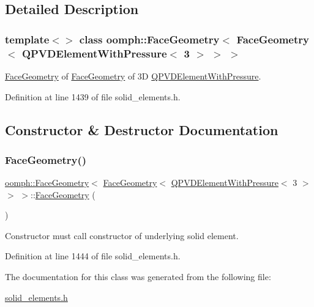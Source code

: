 \subsection{Detailed Description}
\subsubsection*{template$<$$>$\newline
class oomph\+::\+Face\+Geometry$<$ Face\+Geometry$<$ Q\+P\+V\+D\+Element\+With\+Pressure$<$ 3 $>$ $>$ $>$}

\hyperlink{classoomph_1_1FaceGeometry}{Face\+Geometry} of \hyperlink{classoomph_1_1FaceGeometry}{Face\+Geometry} of 3D \hyperlink{classoomph_1_1QPVDElementWithPressure}{Q\+P\+V\+D\+Element\+With\+Pressure}. 

Definition at line 1439 of file solid\+\_\+elements.\+h.



\subsection{Constructor \& Destructor Documentation}
\mbox{\label{classoomph_1_1FaceGeometry_3_01FaceGeometry_3_01QPVDElementWithPressure_3_013_01_4_01_4_01_4_a0e123fcd52796dcbfb88b7ac5e238229}} 
\subsubsection{\texorpdfstring{Face\+Geometry()}{FaceGeometry()}}
{\footnotesize\ttfamily \hyperlink{classoomph_1_1FaceGeometry}{oomph\+::\+Face\+Geometry}$<$ \hyperlink{classoomph_1_1FaceGeometry}{Face\+Geometry}$<$ \hyperlink{classoomph_1_1QPVDElementWithPressure}{Q\+P\+V\+D\+Element\+With\+Pressure}$<$ 3 $>$ $>$ $>$\+::\hyperlink{classoomph_1_1FaceGeometry}{Face\+Geometry} (\begin{DoxyParamCaption}{ }\end{DoxyParamCaption})\hspace{0.3cm}{\ttfamily [inline]}}



Constructor must call constructor of underlying solid element. 



Definition at line 1444 of file solid\+\_\+elements.\+h.



The documentation for this class was generated from the following file\+:\begin{DoxyCompactItemize}
\item 
\hyperlink{solid__elements_8h}{solid\+\_\+elements.\+h}\end{DoxyCompactItemize}
